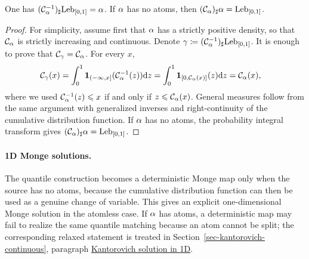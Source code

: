 \begin{prop}\label{prop-quantile-pushforward}
	One has $(\mathcal{C}_{\alpha}^{-1})_\sharp\mathrm{Leb}_{[0,1]}=\alpha$. If $\alpha$ has no atoms, then $(\mathcal{C}_{\alpha})_\sharp\alpha=\mathrm{Leb}_{[0,1]}$.
\end{prop}
\begin{proof}
	For simplicity, assume first that $\alpha$ has a strictly positive density, so that $\mathcal{C}_{\alpha}$ is strictly increasing and continuous. Denote $\gamma\coloneqq(\mathcal{C}_{\alpha}^{-1})_\sharp\mathrm{Leb}_{[0,1]}$. It is enough to prove that $\mathcal{C}_{\gamma}=\mathcal{C}_{\alpha}$. For every $x$,
	\[
	\begin{aligned}
		\mathcal{C}_{\gamma}(x)
		&=
		\int_0^1 \mathbf 1_{(-\infty,x]}(\mathcal{C}_{\alpha}^{-1}(z))\mathrm{d} z
		=
		\int_0^1 \mathbf 1_{[0,\mathcal{C}_{\alpha}(x)]}(z)\mathrm{d} z
		=
		\mathcal{C}_{\alpha}(x),
	\end{aligned}
	\]
	where we used $\mathcal{C}_{\alpha}^{-1}(z)\leqslant x$ if and only if $z\leqslant\mathcal{C}_{\alpha}(x)$. General measures follow from the same argument with generalized inverses and right-continuity of the cumulative distribution function. If $\alpha$ has no atoms, the probability integral transform gives $(\mathcal{C}_{\alpha})_\sharp\alpha=\mathrm{Leb}_{[0,1]}$.
\end{proof}

\paragraph{1D Monge solutions.}\label{par-1d-monge-solution}

The quantile construction becomes a deterministic Monge map only when the source has no atoms, because the cumulative distribution function can then be used as a genuine change of variable. This gives an explicit one-dimensional Monge solution in the atomless case. If $\alpha$ has atoms, a deterministic map may fail to realize the same quantile matching because an atom cannot be split; the corresponding relaxed statement is treated in Section~\ref{sec-kantorovich-continuous}, paragraph \hyperref[sec-1d-kantorovich-solution]{Kantorovich solution in 1D}.

